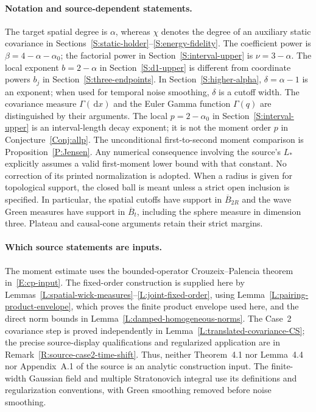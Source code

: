 \documentclass[12pt,oneside,openany]{book}
\numberwithin{equation}{section}
\theoremstyle{nogostyle}
\theoremstyle{definition}
\newcommand{\ud}{\,\mathrm{d}}
\begin{document}
\paragraph{Notation and source-dependent statements.}
The target spatial degree is $\alpha$, whereas $\chi$ denotes the degree of an
auxiliary static covariance in
Sections~\ref{S:static-holder}--\ref{S:energy-fidelity}. The coefficient power
is $\beta = 4-\alpha-\alpha_0$; the factorial power in
Section~\ref{S:interval-upper} is $\nu = 3-\alpha$. The local exponent $b =
2-\alpha$ in Section~\ref{S:d1-upper} is different from coordinate powers $b_j$
in Section~\ref{S:three-endpoints}. In Section~\ref{S:higher-alpha}, $\delta =
\alpha-1$ is an exponent; when used for temporal noise smoothing, $\delta$ is a
cutoff width. The covariance measure $\Gamma(\ud x)$ and the Euler Gamma
function $\Gamma(q)$ are distinguished by their arguments. The local $p =
2-\alpha_0$ in Section~\ref{S:interval-upper} is an interval-length decay
exponent; it is not the moment order $p$ in Conjecture~\ref{Conj:allp}. The
unconditional first-to-second moment comparison is Proposition~\ref{P:Jensen}.
Any numerical consequence involving the source's $L_*$ explicitly assumes a
valid first-moment lower bound with that constant. No correction of its printed
normalization is adopted. When a radius is given for topological support, the
closed ball is meant unless a strict open inclusion is specified. In particular,
the spatial cutoffs have support in $\overline{B}_{2R}$ and the wave Green
measures have support in $\overline{B}_t$, including the sphere measure in
dimension three. Plateau and causal-cone arguments retain their strict margins.

\paragraph{Which source statements are inputs.}
The moment estimate uses the bounded-operator Crouzeix--Palencia theorem
in~\eqref{E:cp-input}. The fixed-order construction is supplied here by
Lemmas~\ref{L:spatial-wick-measures}--\ref{L:joint-fixed-order}, using
Lemma~\ref{L:pairing-product-envelope}, which proves the finite product envelope
used here, and the direct norm bounds in Lemma~\ref{L:damped-homogeneous-norms}.
The Case~2 covariance step is proved independently in
Lemma~\ref{L:translated-covariance-CS}; the precise source-display
qualifications and regularized application are in
Remark~\ref{R:source-case2-time-shift}. Thus, neither Theorem~4.1 nor Lemma~4.4
nor Appendix~A.1 of the source is an analytic construction input. The
finite-width Gaussian field and multiple Stratonovich integral use its
definitions and regularization conventions, with Green smoothing removed before
noise smoothing.
\end{document}
